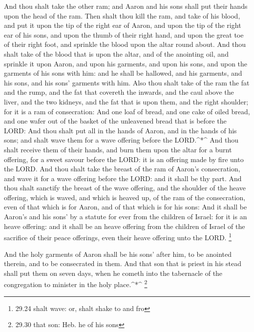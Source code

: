  And thou shalt take the other ram; and Aaron and his sons
shall put their hands upon the head of the ram.  Then shalt
thou kill the ram, and take of his blood, and put it upon the tip of the
right ear of Aaron, and upon the tip of the right ear of his sons, and
upon the thumb of their right hand, and upon the great toe of their
right foot, and sprinkle the blood upon the altar round about.
 And thou shalt take of the blood that is upon the altar,
and of the anointing oil, and sprinkle it upon Aaron, and upon his
garments, and upon his sons, and upon the garments of his sons with him:
and he shall be hallowed, and his garments, and his sons, and his sons'
garments with him.  Also thou shalt take of the ram the fat
and the rump, and the fat that covereth the inwards, and the caul above
the liver, and the two kidneys, and the fat that is upon them, and the
right shoulder; for it is a ram of consecration:  And one
loaf of bread, and one cake of oiled bread, and one wafer out of the
basket of the unleavened bread that is before the LORD: 
And thou shalt put all in the hands of Aaron, and in the hands of his
sons; and shalt wave them for a wave offering before the LORD.\^{}*\^{}
 And thou shalt receive them of their hands, and burn them
upon the altar for a burnt offering, for a sweet savour before the LORD:
it is an offering made by fire unto the LORD.  And thou
shalt take the breast of the ram of Aaron's consecration, and wave it
for a wave offering before the LORD: and it shall be thy part.
 And thou shalt sanctify the breast of the wave offering,
and the shoulder of the heave offering, which is waved, and which is
heaved up, of the ram of the consecration, even of that which is for
Aaron, and of that which is for his sons:  And it shall be
Aaron's and his sons' by a statute for ever from the children of Israel:
for it is an heave offering: and it shall be an heave offering from the
children of Israel of the sacrifice of their peace offerings, even their
heave offering unto the LORD. \footnote{29.24 shalt wave: or, shalt
  shake to and fro}

 And the holy garments of Aaron shall be his sons' after
him, to be anointed therein, and to be consecrated in them.
 And that son that is priest in his stead shall put them on
seven days, when he cometh into the tabernacle of the congregation to
minister in the holy place.\^{}*\^{} \footnote{29.30 that son: Heb. he
  of his sons}

